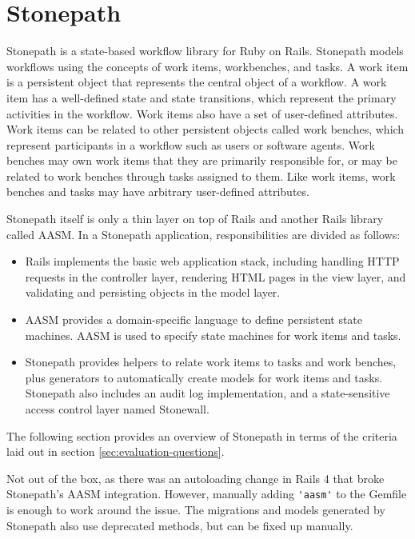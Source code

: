 \section {Stonepath}

Stonepath is a state-based workflow library for Ruby on Rails. Stonepath models workflows using the concepts of work items, workbenches, and tasks. A work item is a persistent object that represents the central object of a workflow. A work item has a well-defined state and state transitions, which represent the primary activities in the workflow. Work items also have a set of user-defined attributes. Work items can be related to other persistent objects called work benches, which represent participants in a workflow such as users or software agents. Work benches may own work items that they are primarily responsible for, or may be related to work benches through tasks assigned to them. Like work items, work benches and tasks may have arbitrary user-defined attributes.

Stonepath itself is only a thin layer on top of Rails and another Rails library called AASM. In a Stonepath application, responsibilities are divided as follows:

\begin{itemize}
\item Rails implements the basic web application stack, including handling HTTP requests in the controller layer, rendering HTML pages in the view layer, and validating and persisting objects in the model layer.
\item AASM provides a domain-specific language to define persistent state machines. AASM is used to specify state machines for work items and tasks.
\item Stonepath provides helpers to relate work items to tasks and work benches, plus generators to automatically create models for work items and tasks. Stonepath also includes an audit log implementation, and a state-sensitive access control layer named Stonewall.
\end{itemize}

The following section provides an overview of Stonepath in terms of the criteria laid out in section \ref{sec:evaluation-questions}.



Not out of the box, as there was an autoloading change in Rails 4 that broke Stonepath’s AASM integration. However, manually adding \verb!'aasm'! to the Gemfile is enough to work around the issue. The migrations and models generated by Stonepath also use deprecated methods, but can be fixed up manually.

